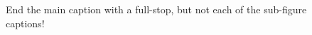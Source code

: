 \begin{figure}
{\label{thirdfigure}
}
\quad
{}
\caption[Do not end the short caption with a full-stop]{End the main caption with a full-stop, but not each of the sub-figure captions!}
\label{thislabel}
\end{figure}
